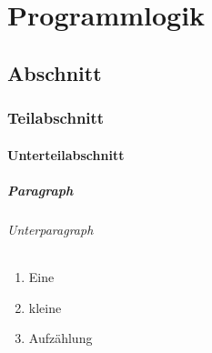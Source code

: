 
\chapter{Programmlogik}
\section{Abschnitt}
\subsection{Teilabschnitt}
\subsubsection{Unterteilabschnitt}
\paragraph{Paragraph}
\subparagraph{Unterparagraph}

\begin{enumerate}
     \item Eine
     \item kleine
     \item Aufzählung
\end{enumerate}
